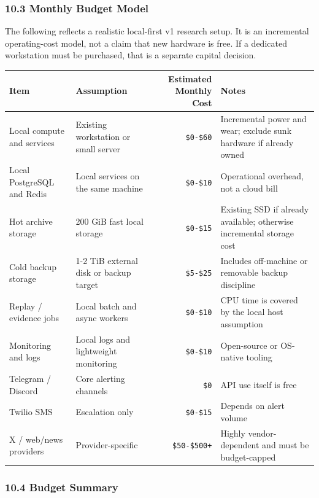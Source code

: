 \documentclass[
]{article}
\newcounter{none} %
\begin{document}
\subsubsection{10.3 Monthly Budget
Model}\label{103-monthly-budget-model}

The following reflects a realistic local-first v1 research setup. It is
an incremental operating-cost model, not a claim that new hardware is
free. If a dedicated workstation must be purchased, that is a separate
capital decision.

{\def\LTcaptype{none} %
\begin{longtable}[]{@{}llrl@{}}
\toprule\noalign{}
Item & Assumption & Estimated Monthly Cost & Notes \\
\midrule\noalign{}
\endhead
\bottomrule\noalign{}
\endlastfoot
Local compute and services & Existing workstation or small server &
\texttt{\$0-\$60} & Incremental power and wear; exclude sunk hardware if
already owned \\
Local PostgreSQL and Redis & Local services on the same machine &
\texttt{\$0-\$10} & Operational overhead, not a cloud bill \\
Hot archive storage & 200 GiB fast local storage &
\texttt{\$0-\$15} & Existing SSD if already available; otherwise
incremental storage cost \\
Cold backup storage & 1-2 TiB external disk or backup target &
\texttt{\$5-\$25} & Includes off-machine or removable backup discipline \\
Replay / evidence jobs & Local batch and async workers &
\texttt{\$0-\$10} & CPU time is covered by the local host assumption \\
Monitoring and logs & Local logs and lightweight monitoring &
\texttt{\$0-\$10} & Open-source or OS-native tooling \\
Telegram / Discord & Core alerting channels & \texttt{\$0} & API use
itself is free \\
Twilio SMS & Escalation only & \texttt{\$0-\$15} & Depends on alert
volume \\
X / web/news providers & Provider-specific & \texttt{\$50-\$500+} &
Highly vendor-dependent and must be budget-capped \\
\end{longtable}
}

\subsubsection{10.4 Budget Summary}\label{104-budget-summary}
\end{document}
